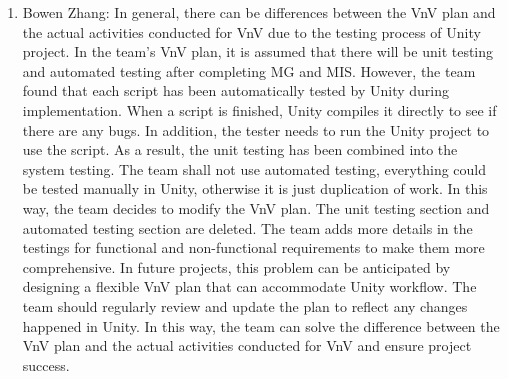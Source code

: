\documentclass[12pt, titlepage]{article}
\begin{document}
\begin{enumerate}
  \item Bowen Zhang: In general, there can be differences between the VnV plan and the actual activities conducted for VnV due to the testing process of Unity project. In the team's VnV plan, it is assumed that there will be unit testing and automated testing after completing MG and MIS. However, the team found that each script has been automatically tested by Unity during implementation. When a script is finished, Unity compiles it directly to see if there are any bugs. In addition, the tester needs to run the Unity project to use the script. As a result, the unit testing has been combined into the system testing. The team shall not use automated testing, everything could be tested manually in Unity, otherwise it is just duplication of work. In this way, the team decides to modify the VnV plan. The unit testing section and automated testing section are deleted. The team adds more details in the testings for functional and non-functional requirements to make them more comprehensive. In future projects, this problem can be anticipated by designing a flexible VnV plan that can accommodate Unity workflow. The team should regularly review and update the plan to reflect any changes happened in Unity. In this way, the team can solve the difference between the VnV plan and the actual activities conducted for VnV and ensure project success.


\end{enumerate}
\end{document}
